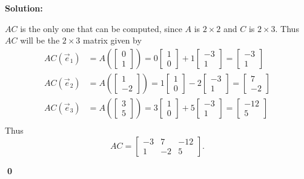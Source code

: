 \documentclass{article}
\newenvironment{solution}
{
  \ignorespaces
  \textbf{Solution:}
}
{
  \ignorespacesafterend
  \begin{flushright}
  {\bfseries \qed}
  \end{flushright}
}
\begin{document}
\begin{solution}
\(AC\) is the only one that can be computed, since \(A\) is \(2\times 2\)
and \(C\) is \(2\times 3\). Thus \(AC\) will be the \(2\times 3\) matrix
given by
\begin{align*}
AC\left( \vec{e}_1 \right) &= A \left( \begin{bmatrix} 0 \\ 1 \end{bmatrix} \right) = 0 \begin{bmatrix} 1 \\ 0 \end{bmatrix} + 1\begin{bmatrix} -3 \\ 1 \end{bmatrix} = \begin{bmatrix} -3 \\ 1 \end{bmatrix} \\
AC\left( \vec{e}_2 \right) &= A \left( \begin{bmatrix} 1 \\ -2 \end{bmatrix} \right) = 1 \begin{bmatrix} 1 \\ 0 \end{bmatrix} -2\begin{bmatrix} -3 \\ 1 \end{bmatrix} = \begin{bmatrix} 7 \\ -2 \end{bmatrix} \\
AC\left( \vec{e}_3 \right) &= A \left( \begin{bmatrix} 3 \\ 5 \end{bmatrix} \right) = 3 \begin{bmatrix} 1 \\ 0 \end{bmatrix} + 5\begin{bmatrix} -3 \\ 1 \end{bmatrix} = \begin{bmatrix} -12 \\ 5 \end{bmatrix} \\
\end{align*}
Thus
$$AC = \begin{bmatrix} -3 & 7 & -12 \\ 1 & -2 & 5 \end{bmatrix}.$$
\end{solution}
\end{document}
